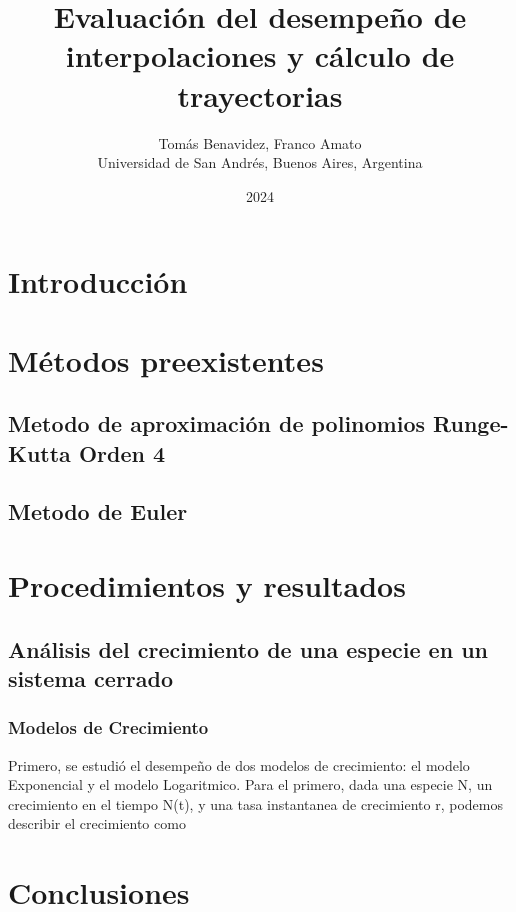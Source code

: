 \documentclass[12pt]{article} %
\title{Evaluación del desempeño de interpolaciones y cálculo de trayectorias}
\author{Tomás Benavidez, Franco Amato\\ [2mm] %
\small Universidad de San Andrés, Buenos Aires, Argentina}
\date{2024}
\begin{document}
\maketitle

\begin{abstract}
\end{abstract}

\vspace{0.1cm}

\begin{multicols}{2}
\raggedcolumns

\section{Introducción}

\section{Métodos preexistentes}

\subsection*{Metodo de aproximación de polinomios Runge-Kutta Orden 4}

\subsection*{Metodo de Euler}

\section{Procedimientos y resultados}

\subsection{Análisis del crecimiento de una especie en un sistema cerrado}\label{sec:1}
\subsubsection{Modelos de Crecimiento}\label{ssec:1a}

Primero, se estudió el desempeño de dos modelos de crecimiento: el modelo Exponencial y el modelo Logaritmico. Para el primero, dada una especie N, un crecimiento en el tiempo N(t), 
y una tasa instantanea de crecimiento r, podemos describir el crecimiento como 


\section{Conclusiones}

\begin{thebibliography}{99} %

\end{thebibliography}

\end{multicols}
\end{document}
